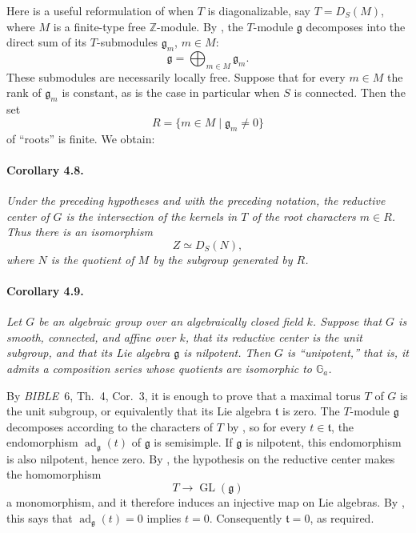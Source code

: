 Here is a useful reformulation of \textup{} when \(T\) is
diagonalizable, say \(T=D_S(M)\), where \(M\) is a finite-type free
\(\mathbb Z\)-module. By , the \(T\)-module \(\mathfrak g\)
decomposes into the direct sum of its \(T\)-submodules
\(\mathfrak g_m\), \(m\in M\):
\[
  \mathfrak g=\bigoplus_{m\in M}\mathfrak g_m.
\]
These submodules are necessarily locally free. Suppose that for
every \(m\in M\) the rank of \(\mathfrak g_m\) is constant, as is
the case in particular when \(S\) is connected. Then the set
\[
  R=\{m\in M\mid\mathfrak g_m\ne0\}
\]
of ``roots'' is finite. We obtain:

\paragraph{\textbf{Corollary 4.8.}}
\emph{Under the preceding hypotheses and with the preceding
notation, the reductive center of \(G\) is the intersection of the
kernels in \(T\) of the root characters \(m\in R\). Thus there is
an isomorphism
\[
  Z\simeq D_S(N),
\]
where \(N\) is the quotient of \(M\) by the subgroup generated by
\(R\).}

\paragraph{\textbf{Corollary 4.9.}}
\emph{Let \(G\) be an algebraic group over an algebraically closed
field \(k\). Suppose that \(G\) is smooth, connected, and affine
over \(k\), that its reductive center is the unit subgroup, and that
its Lie algebra \(\mathfrak g\) is nilpotent. Then \(G\) is
``unipotent,'' that is, it admits a composition series whose
quotients are isomorphic to \(\mathbb G_a\).}

By \emph{BIBLE}~6, Th.~4, Cor.~3, it is enough to prove that a
maximal torus \(T\) of \(G\) is the unit subgroup, or equivalently
that its Lie algebra \(\mathfrak t\) is zero. The \(T\)-module
\(\mathfrak g\) decomposes according to the characters of \(T\) by
, so for every \(t\in\mathfrak t\), the endomorphism
\(\operatorname{ad}_{\mathfrak g}(t)\) of \(\mathfrak g\) is
semisimple. If \(\mathfrak g\) is nilpotent, this endomorphism is
also nilpotent, hence zero. By , the hypothesis on the
reductive center makes the homomorphism
\[
  T\longrightarrow\operatorname{GL}(\mathfrak g)
\]
a monomorphism, and it therefore induces an injective map on Lie
algebras. By , this says that
\(\operatorname{ad}_{\mathfrak g}(t)=0\) implies \(t=0\).
Consequently \(\mathfrak t=0\), as required.

